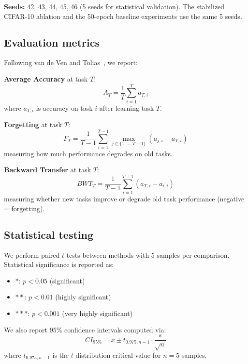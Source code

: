 \documentclass[preprint,review,12pt]{elsarticle}
\begin{document}
\textbf{Seeds:} 42, 43, 44, 45, 46 (5 seeds for statistical validation). The stabilized CIFAR-10 ablation and the 50-epoch baseline experiments use the same 5 seeds.

\subsection{Evaluation metrics}

Following van de Ven and Tolias~\cite{van2019three}, we report:

\textbf{Average Accuracy} at task $T$:
\begin{equation}
A_T = \frac{1}{T} \sum_{i=1}^{T} a_{T,i}
\end{equation}
where $a_{T,i}$ is accuracy on task $i$ after learning task $T$.

\textbf{Forgetting} at task $T$:
\begin{equation}
F_T = \frac{1}{T-1} \sum_{i=1}^{T-1} \max_{j \in \{1,\ldots,T-1\}} (a_{j,i} - a_{T,i})
\end{equation}
measuring how much performance degrades on old tasks.

\textbf{Backward Transfer} at task $T$:
\begin{equation}
BWT_T = \frac{1}{T-1} \sum_{i=1}^{T-1} (a_{T,i} - a_{i,i})
\end{equation}
measuring whether new tasks improve or degrade old task performance (negative = forgetting).

\subsection{Statistical testing}

We perform paired $t$-tests between methods with 5 samples per comparison. Statistical significance is reported as:
\begin{itemize}
\item $*$: $p < 0.05$ (significant)
\item $**$: $p < 0.01$ (highly significant)
\item $***$: $p < 0.001$ (very highly significant)
\end{itemize}

We also report 95\% confidence intervals computed via:
\begin{equation}
CI_{95\%} = \bar{x} \pm t_{0.975, n-1} \cdot \frac{s}{\sqrt{n}}
\end{equation}
where $t_{0.975, n-1}$ is the $t$-distribution critical value for $n=5$ samples.
\end{document}
